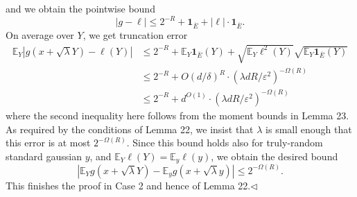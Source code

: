 and we obtain the pointwise bound
\[|g-\ell|\leq2^{-R}+\boldsymbol1_{\overline E}+|\ell|\cdot\boldsymbol1_{\overline E}.\]
On average over $Y$, we get truncation error
\begin{align*}
\mathbb E_Y|g(x+\sqrt\lambda Y)-\ell(Y)|
&\leq2^{-R}+\mathbb E_Y\boldsymbol1_{\overline E}(Y)+\sqrt{\mathbb E_Y\ell^2(Y)}\sqrt{\mathbb E_Y\boldsymbol1_{\overline E}(Y)}\\
&\leq2^{-R}+O(d/\delta)^R\cdot(\lambda dR/\varepsilon^2)^{-\Omega(R)}\\
&\leq2^{-R}+d^{O(1)}\cdot(\lambda dR/\varepsilon^2)^{-\Omega(R)}
\end{align*}
where the second inequality here follows from the moment bounds in Lemma 23. As required by the conditions of Lemma 22, we insist that $\lambda$ is small enough that this error is at most $2^{-\Omega(R)}$. Since this bound holds also for truly-random standard gaussian $y$, and $\mathbb E_Y\ell(Y)=\mathbb E_y\ell(y)$, we obtain the desired bound
\[|\mathbb E_Yg(x+\sqrt\lambda Y)-\mathbb E_yg(x+\sqrt\lambda y)|\leq2^{-\Omega(R)}.\]
This finishes the proof in Case 2 and hence of Lemma 22.\hfill$\triangleleft$
